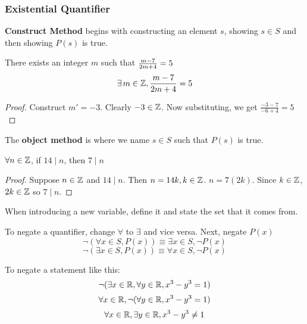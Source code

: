 \documentclass[english, 12pt]{article}
\begin{document}
\subsubsection{Existential Quantifier}
\begin{mthd}
\textbf{Construct Method} begins with constructing an element $s$, showing $s \in S$ and then showing $P(s)$ is true.
\end{mthd}
\begin{exmp}
There exists an integer $m$ such that $\frac{m-7}{2m+4}=5$
\[\exists\, m \in {\mathbb{Z}}, \frac{m-7}{2m+4} = 5 \]
\begin{proof}
Construct $m'=-3$. Clearly $-3 \in {\mathbb{Z}}$. Now substituting, we get $\frac{-3-7}{-6+4} = 5$
\end{proof}
\end{exmp}

\begin{mthd}
The \textbf{object method} is where we name $s \in S$ such that $P(s)$ is true.
\end{mthd}
\begin{exmp}
$\forall n\in {\mathbb{Z}}$, if $14 \mid n$, then $7 \mid n$
\begin{proof}
Suppose $n \in {\mathbb{Z}}$ and $14 \mid n$. Then $n = 14k, k \in {\mathbb{Z}}$. $n = 7(2k)$. Since $k \in {\mathbb{Z}}$, $2k \in {\mathbb{Z}}$ so $ 7 \mid n$.
 \end{proof}
\end{exmp}
\begin{note}
When introducing a new variable, define it and state the set that it comes from.
\end{note}
\begin{defn}
To negate a quantifier, change $\forall$ to $\exists$ and vice versa. Next, negate $P(x)$
\[ \lnot (\forall x \in S, P(x)) \equiv \exists x \in S, \lnot P(x) \]
\[ \lnot (\exists x \in S, P(x)) \equiv \forall x \in S, \lnot P(x) \]
\end{defn}
\begin{exmp}
To negate a statement like this:
\[ \lnot (\exists x \in {\mathbb{R}}, \forall y \in {\mathbb{R}}, x^3-y^3 = 1) \]
\[ \forall x \in {\mathbb{R}}, \lnot(\forall y \in {\mathbb{R}}, x^3-y^3 = 1) \]
\[ \forall x \in {\mathbb{R}}, \exists y \in {\mathbb{R}}, x^3-y^3 \neq 1 \]
\end{exmp}
\end{document}
